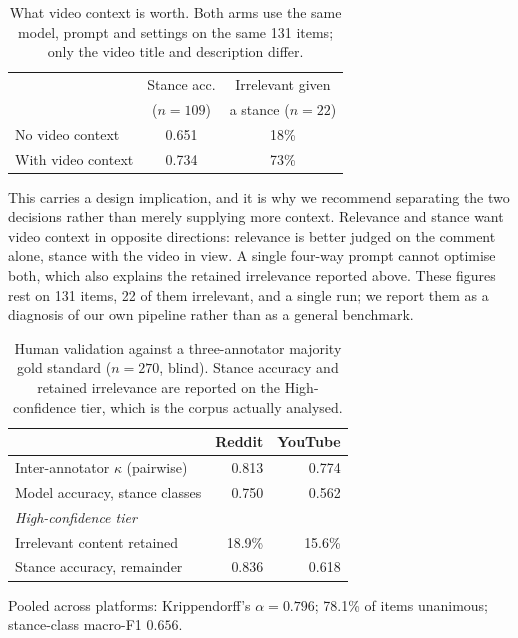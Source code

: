 \documentclass[pdflatex,sn-basic,Numbered,iicol]{sn-jnl}
\begin{document}
\begin{table}[t]
  \centering
  \footnotesize
  \setlength{\tabcolsep}{3pt}
  \caption{What video context is worth. Both arms use the same model, prompt and
  settings on the same 131 items; only the video title and description differ.}
  \label{tab:context}
  \setlength{\tabcolsep}{4pt}
  \begin{tabular}{@{}lcc@{}}
    \toprule
    & Stance acc. & Irrelevant given \\
    & ($n=109$) & a stance ($n=22$) \\
    \midrule
    No video context   & 0.651 & 18\% \\
    With video context & 0.734 & 73\% \\
    \bottomrule
  \end{tabular}
\end{table}

This carries a design implication, and it is why we recommend separating the two
decisions rather than merely supplying more context. Relevance and stance want
video context in opposite directions: relevance is better judged on the comment
alone, stance with the video in view. A single four-way prompt cannot optimise
both, which also explains the retained irrelevance reported above. These figures
rest on 131 items, 22 of them irrelevant, and a single run; we report them as a
diagnosis of our own pipeline rather than as a general benchmark.

\begin{table}[t]
  \centering
  \footnotesize
  \setlength{\tabcolsep}{3pt}
  \caption{Human validation against a three-annotator majority gold standard
  ($n=270$, blind). Stance accuracy and retained irrelevance are reported on the
  High-confidence tier, which is the corpus actually analysed.}
  \label{tab:human}
  \begin{tabular}{@{}lrr@{}}
    \toprule
     & Reddit & YouTube \\
    \midrule
    Inter-annotator $\kappa$ (pairwise) & 0.813 & 0.774 \\
    Model accuracy, stance classes & 0.750 & 0.562 \\
    \midrule
    \multicolumn{3}{l}{\emph{High-confidence tier}} \\
    Irrelevant content retained & 18.9\% & 15.6\% \\
    Stance accuracy, remainder & 0.836 & 0.618 \\
    \bottomrule
  \end{tabular}
  \footnotesize Pooled across platforms: Krippendorff's $\alpha = 0.796$;
  78.1\% of items unanimous; stance-class macro-F1 $0.656$.
\end{table}
\end{document}
